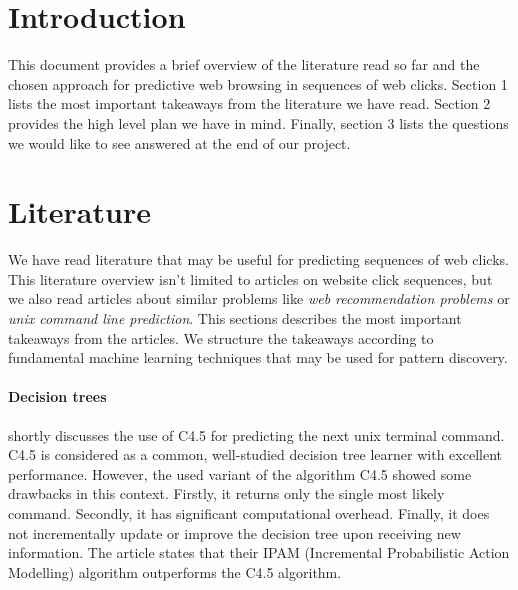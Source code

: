 \documentclass[a4paper,10pt]{article}
\begin{document}



\section{Introduction}
This document provides a brief overview of the literature read so far and the chosen approach for predictive web browsing in sequences of web clicks. Section 1 lists the most important takeaways from the literature we have read. Section 2 provides the high level plan we have in mind. Finally, section 3 lists the questions we would like to see answered at the end of our project.

\section{Literature}
We have read literature that may be useful for predicting sequences of web clicks. This literature overview isn't limited to articles on website click sequences, but we also read articles about similar problems like \textit{web recommendation problems} or \textit{unix command line prediction}. This sections describes the most important takeaways from the articles. We structure the takeaways according to fundamental machine learning techniques that may be used for pattern discovery. 

\paragraph{Decision trees} \cite{davison+hirsch} shortly discusses the use of C4.5 for predicting the next unix terminal command. C4.5 is considered as a common, well-studied decision tree learner with excellent performance. However,  the used variant of the algorithm C4.5 showed some drawbacks in this context. Firstly, it returns only the single most likely command. Secondly, it has significant computational overhead. Finally, it does not incrementally update or improve the decision tree upon receiving new information. The article states that their IPAM (Incremental Probabilistic Action Modelling) algorithm outperforms the C4.5 algorithm.
\end{document}
